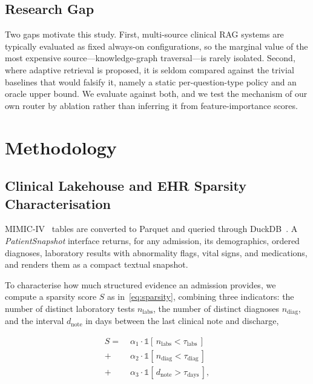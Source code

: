 \documentclass[preprint,12pt]{elsarticle}
\begin{document}
\subsection{Research Gap}

Two gaps motivate this study. First, multi-source clinical RAG systems
are typically evaluated as fixed always-on configurations, so the
marginal value of the most expensive source---knowledge-graph
traversal---is rarely isolated. Second, where adaptive retrieval is
proposed, it is seldom compared against the trivial baselines that
would falsify it, namely a static per-question-type policy and an
oracle upper bound. We evaluate against both, and we test the
mechanism of our own router by ablation rather than inferring it from
feature-importance scores.

\section{Methodology}

\subsection{Clinical Lakehouse and EHR Sparsity Characterisation}

MIMIC-IV~\cite{mimiciv2023} tables are converted to Parquet and queried
through DuckDB~\cite{duckdb2019}. A \textit{PatientSnapshot} interface
returns, for any admission, its demographics, ordered diagnoses,
laboratory results with abnormality flags, vital signs, and
medications, and renders them as a compact textual snapshot.

To characterise how much structured evidence an admission provides, we
compute a sparsity score $S$ as in~\eqref{eq:sparsity}, combining three
indicators: the number of distinct laboratory tests $n_{\text{labs}}$,
the number of distinct diagnoses $n_{\text{diag}}$, and the interval
$d_{\text{note}}$ in days between the last clinical note and
discharge,

\begin{equation}
\label{eq:sparsity}
\begin{split}
S = \; &\alpha_1 \cdot \mathbb{1}[\,n_{\text{labs}} < \tau_{\text{labs}}\,] \\
     + &\alpha_2 \cdot \mathbb{1}[\,n_{\text{diag}} < \tau_{\text{diag}}\,] \\
     + &\alpha_3 \cdot \mathbb{1}[\,d_{\text{note}} > \tau_{\text{days}}\,],
\end{split}
\end{equation}
\end{document}
